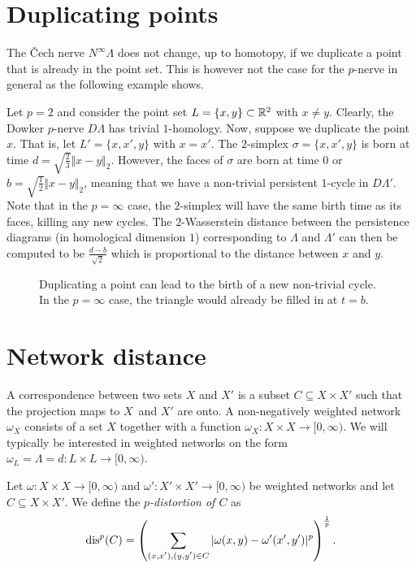 	\section{Duplicating points}
	The Čech nerve $N^\infty\Lambda$ does not change, up to homotopy, if we duplicate a point that is already in the point set. This is however not the case for the $p$-nerve in general as the following example shows.
	
	\begin{ex}
		Let $p=2$ and consider the point set $L=\{x,y\}\subset\mathbb{R}^2$ with $x\neq y$. Clearly, the Dowker $p$-nerve $D\Lambda$ has trivial $1$-homology. Now, suppose we duplicate the point $x$. That is, let $L'=\{x,x',y\}$ with $x=x'$. The $2$-simplex $\sigma=\{x,x',y\}$ is born at time $d=\sqrt{\frac{2}{3}}\Vert x-y\Vert_2$. However, the faces of $\sigma$ are born at time $0$ or $b=\sqrt{\frac{1}{2}}\Vert x-y\Vert_2$, meaning that we have a non-trivial persistent $1$-cycle in $D\Lambda'$. Note that in the $p=\infty$ case, the $2$-simplex will have the same birth time as its faces, killing any new cycles. The $2$-Wasserstein distance between the persistence diagrams (in homological dimension $1$) corresponding to $\Lambda$ and $\Lambda'$ can then be computed to be $\frac{d-b}{\sqrt{2}}$ which is proportional to the distance between $x$ and $y$.
		
		\begin{figure}[h!]
			\centering
			
			\caption{Duplicating a point can lead to the birth of a new non-trivial cycle. In the $p=\infty$ case, the triangle would already be filled in at $t=b$.}
		\end{figure}
	\end{ex}
	
	\section{Network distance}
	A correspondence between two sets $X$ and $X'$ is a subset $C\subseteq X\times X'$ such that the projection maps to $X$ and $X'$ are onto. A non-negatively weighted network $\omega_X$ consists of a set $X$ together with a function $\omega_X\colon X\times X\to[0,\infty)$. We will typically be interested in weighted networks on the form $\omega_L=\Lambda=d\colon L\times L\to[0,\infty)$.
	
	\begin{defn}
		Let $\omega\colon X\times X\to[0,\infty)$ and $\omega'\colon X'\times X'\to[0,\infty)$ be weighted networks and let $C\subseteq X\times X'$. We define the \textit{$p$-distortion of $C$} as 
		$$
		\operatorname{dis}^p(C) = \left(\sum_{\substack{(x,x'),(y,y')\in C}}\vert\omega(x,y)-\omega'(x',y')\vert^p\right)^{\frac{1}{p}}.
		$$
	\end{defn}
	
